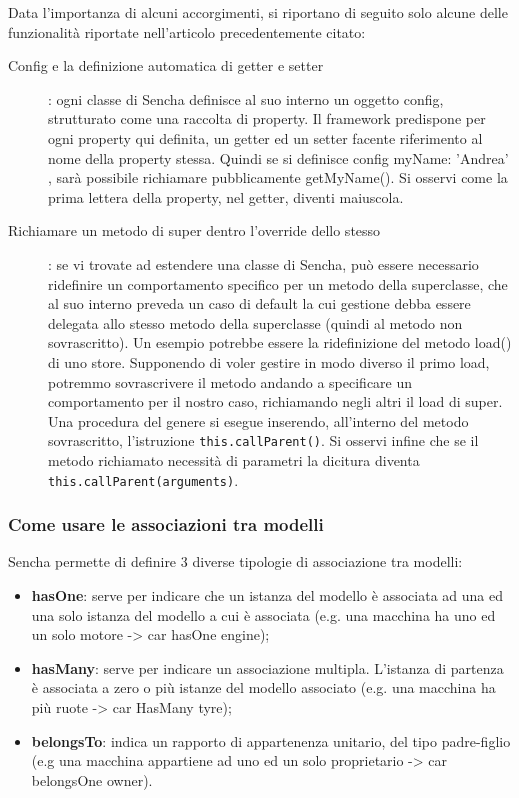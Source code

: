 \documentclass[10pt,a4paper,onecolumn]{article}
\begin{document}
Data l'importanza di alcuni accorgimenti, si riportano di seguito solo alcune delle funzionalità riportate nell'articolo precedentemente citato:
\begin{description}
	\item[Config e la definizione automatica di getter e setter]: ogni classe di Sencha definisce al suo interno un oggetto config, strutturato come una raccolta di property. Il framework predispone per ogni property qui definita, un getter ed un setter facente riferimento al nome della property stessa. Quindi se si definisce config{ myName: 'Andrea' }, sarà possibile richiamare pubblicamente getMyName(). Si osservi come la prima lettera della property, nel getter, diventi maiuscola.
	\item[Richiamare un metodo di super dentro l'override dello stesso]: se vi trovate ad estendere una classe di Sencha, può essere necessario ridefinire un comportamento specifico per un metodo della superclasse, che al suo interno preveda un caso di default la cui gestione debba essere delegata allo stesso metodo della superclasse (quindi al metodo non sovrascritto). Un esempio potrebbe essere la ridefinizione del metodo load() di uno store. Supponendo di voler gestire in modo diverso il primo load, potremmo sovrascrivere il metodo andando a specificare un comportamento per il nostro caso, richiamando negli altri il load di super. Una procedura del genere si esegue inserendo, all'interno del metodo sovrascritto, l'istruzione \texttt{this.callParent()}. Si osservi infine che se il metodo richiamato necessità di parametri la dicitura diventa \texttt{this.callParent(arguments)}.
\end{description}

\subsubsection{Come usare le associazioni tra modelli}
Sencha permette di definire 3 diverse tipologie di associazione tra modelli:
\begin{itemize}
	\item \textbf{hasOne}: serve per indicare che un istanza del modello è associata ad una ed una solo istanza del modello a cui è associata (e.g. una macchina ha uno ed un solo motore -> car hasOne engine);
	\item \textbf{hasMany}: serve per indicare un associazione multipla. L'istanza di partenza è associata a zero o più istanze del modello associato (e.g. una macchina ha più ruote -> car HasMany tyre);
	\item \textbf{belongsTo}: indica un rapporto di appartenenza unitario, del tipo padre-figlio (e.g una macchina appartiene ad uno ed un solo proprietario -> car belongsOne owner).
\end{itemize}
\end{document}
